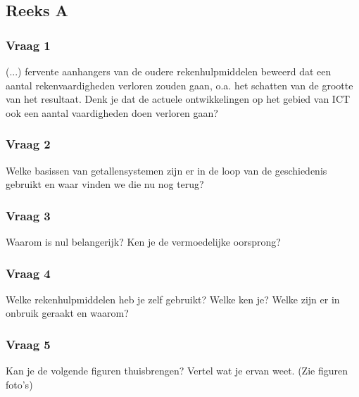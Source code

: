 \documentclass[../main.tex]{subfiles}
\begin{document}
\subsection{Reeks A}

\subsubsection{Vraag 1}
\begin{question}(...) fervente aanhangers van de oudere rekenhulpmiddelen beweerd dat een aantal rekenvaardigheden verloren zouden gaan, o.a. het schatten van de grootte van het resultaat. Denk je dat de actuele ontwikkelingen op het gebied van ICT ook een aantal vaardigheden doen verloren gaan?
\end{question}

\subsubsection{Vraag 2}
\begin{question}
Welke basissen van getallensystemen zijn er in de loop van de geschiedenis gebruikt en waar vinden we die nu nog terug?
\end{question}

\subsubsection{Vraag 3}
\begin{question}
Waarom is nul belangerijk? Ken je de vermoedelijke oorsprong?
\end{question}

\subsubsection{Vraag 4}
\begin{question}
Welke rekenhulpmiddelen heb je zelf gebruikt? Welke ken je? Welke zijn er in onbruik geraakt en waarom?
\end{question}

\subsubsection{Vraag 5}
\begin{question}
Kan je de volgende figuren thuisbrengen? Vertel wat je ervan weet. (Zie figuren foto’s)
\end{question}
\end{document}
